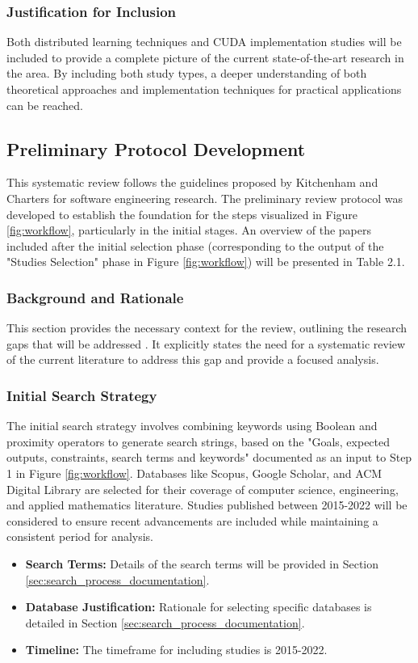 \subsubsection{Justification for Inclusion}
Both distributed learning techniques and CUDA implementation studies will be included to provide a
complete picture of the current state-of-the-art research in the area. By including both study types,
a deeper understanding of both theoretical approaches and implementation techniques for practical
applications can be reached.

\subsection{Preliminary Protocol Development}
This systematic review follows the guidelines proposed by Kitchenham and Charters for software
engineering research. The preliminary review protocol was developed to establish the foundation for the steps visualized in Figure \ref{fig:workflow}, particularly in the initial stages. An overview of the papers included after the initial selection phase (corresponding to the output of the "Studies Selection" phase in Figure \ref{fig:workflow}) will be presented in Table 2.1.

\subsubsection{Background and Rationale}
This section provides the necessary context for the review, outlining the research gaps that will be
addressed \cite{ben-nun_demystifying_2020}. It explicitly states the need for a systematic review of the current literature to address
this gap and provide a focused analysis.

\subsubsection{Initial Search Strategy}
The initial search strategy involves combining keywords using Boolean and proximity operators to generate search strings, based on the "Goals, expected outputs, constraints, search terms and keywords" documented as an input to Step 1 in Figure \ref{fig:workflow}. Databases like Scopus, Google Scholar, and ACM Digital Library are selected for their coverage of computer science, engineering, and applied mathematics literature. Studies published between 2015-2022 will be considered to ensure recent advancements are included while maintaining a consistent period for analysis.
\begin{itemize}
    \item \textbf{Search Terms:} Details of the search terms will be provided in Section \ref{sec:search_process_documentation}.
    \item \textbf{Database Justification:} Rationale for selecting specific databases is detailed in Section \ref{sec:search_process_documentation}.
    \item \textbf{Timeline:} The timeframe for including studies is 2015-2022.
\end{itemize}

